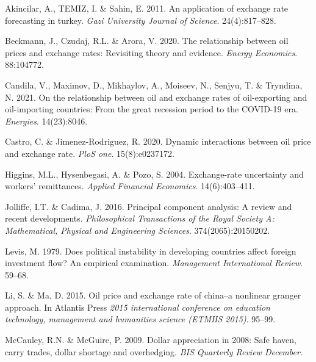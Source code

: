 \documentclass[11pt,preprint, authoryear]{elsarticle}
\numberwithin{equation}{section}
\numberwithin{figure}{section}
\numberwithin{table}{section}
\newlength{\cslhangindent}
\newenvironment{CSLReferences}%
  {\setlength{\parindent}{0pt}%
  \everypar{\setlength{\hangindent}{\cslhangindent}}\ignorespaces}%
  {\par}
\begin{document}
\hypertarget{refs}{}
\begin{CSLReferences}{1}{0}
\leavevmode{}%
Akincilar, A., TEMIZ, I. \& Sahin, E. 2011. An application of exchange
rate forecasting in turkey. \emph{Gazi University Journal of Science}.
24(4):817--828.

\leavevmode{}%
Beckmann, J., Czudaj, R.L. \& Arora, V. 2020. The relationship between
oil prices and exchange rates: Revisiting theory and evidence.
\emph{Energy Economics}. 88:104772.

\leavevmode{}%
Candila, V., Maximov, D., Mikhaylov, A., Moiseev, N., Senjyu, T. \&
Tryndina, N. 2021. On the relationship between oil and exchange rates of
oil-exporting and oil-importing countries: From the great recession
period to the COVID-19 era. \emph{Energies}. 14(23):8046.

\leavevmode{}%
Castro, C. \& Jimenez-Rodriguez, R. 2020. Dynamic interactions between
oil price and exchange rate. \emph{PloS one}. 15(8):e0237172.

\leavevmode{}%
Higgins, M.L., Hysenbegasi, A. \& Pozo, S. 2004. Exchange-rate
uncertainty and workers' remittances. \emph{Applied Financial
Economics}. 14(6):403--411.

\leavevmode{}%
Jolliffe, I.T. \& Cadima, J. 2016. Principal component analysis: A
review and recent developments. \emph{Philosophical Transactions of the
Royal Society A: Mathematical, Physical and Engineering Sciences}.
374(2065):20150202.

\leavevmode{}%
Levis, M. 1979. Does political instability in developing countries
affect foreign investment flow? An empirical examination.
\emph{Management International Review}. 59--68.

\leavevmode{}%
Li, S. \& Ma, D. 2015. Oil price and exchange rate of china--a nonlinear
granger approach. In Atlantis Press \emph{2015 international conference
on education technology, management and humanities science (ETMHS
2015)}. 95--99.

\leavevmode{}%
McCauley, R.N. \& McGuire, P. 2009. Dollar appreciation in 2008: Safe
haven, carry trades, dollar shortage and overhedging. \emph{BIS
Quarterly Review December}.


\end{CSLReferences}
\end{document}
